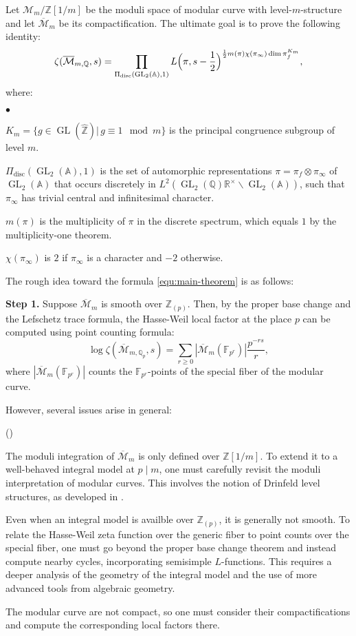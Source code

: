 \documentclass[a4paper, reqno]{amsart} %
\theoremstyle{definition}
\numberwithin{equation}{section}
\newcommand{\mbA}{\mathbb{A}}
\newcommand{\mbF}{\mathbb{F}}
\newcommand{\mbQ}{\mathbb{Q}}
\newcommand{\mbR}{\mathbb{R}}
\newcommand{\mbZ}{\mathbb{Z}}
\newcommand{\mcM}{\mathcal{M}}
\newcommand{\ov}{\overline}
\newenvironment{altenumerate}
	{\begin{list}
			{(\theenumi) }
			{\usecounter{enumi}
				\setlength{\labelwidth}{0pt}
				\setlength{\labelsep}{0pt}
				\setlength{\leftmargin}{0pt}
				\setlength{\itemsep}{\the\smallskipamount}
				\renewcommand{\theenumi}{\arabic{enumi}}
		}}
		{\end{list}}
\newenvironment{altitemize}
	{\begin{list}
			{$\bullet$}
			{\setlength{\labelwidth}{0pt}
				\setlength{\itemindent}{5pt}
				\setlength{\labelsep}{5pt}
				\setlength{\leftmargin}{0pt}
				\setlength{\itemsep}{\the\smallskipamount}
		}}
		{\end{list}}
\newcommand{\GL}{\operatorname{GL}}
\newcommand{\wh}{\widehat}
\begin{document}
Let $\mcM_m/\mbZ[1/m]$ be the moduli space of modular curve with level-$m$-structure and let $\ov{\mcM}_m$ be its compactification. The ultimate goal is to prove the following identity:
\begin{equation}\label{equ:main-theorem}
\zeta(\ov{\mcM}_{m,\mbQ},s)=\prod_{\Pi_{\mathrm{disc}}(\GL_2(\mbA),1)}L\Bigl(\pi,s-\frac{1}{2}\Bigr)^{\frac{1}{2}m(\pi)\chi(\pi_\infty)\dim \pi_f^{K_m}},
\end{equation}
where:
\begin{altitemize}
\item $K_m=\{g\in \GL(\wh{\mbZ}) | \, g\equiv 1 \mod m\}$ is the principal congruence subgroup of level $m$.
\item $\Pi_{\mathrm{disc}}(\GL_2(\mbA),1)$ is the set of automorphic representations $\pi=\pi_f\otimes\pi_\infty$ of $\GL_2(\mbA)$ that occurs discretely in $L^2(\GL_2(\mbQ)\mbR^\times\backslash \GL_2(\mbA))$, such that $\pi_\infty$ has trivial central and infinitesimal character.
\item $m(\pi)$ is the multiplicity of $\pi$ in the discrete spectrum, which equals $1$ by the multiplicity-one theorem.
\item $\chi(\pi_\infty)$ is $2$ if $\pi_\infty$ is a character and $-2$ otherwise.
\end{altitemize}

The rough idea toward the formula \eqref{equ:main-theorem} is as follows:

\noindent\textbf{Step 1.} Suppose $\ov{\mcM}_m$ is smooth over $\mbZ_{(p)}$. Then, by the proper base change and the Lefschetz trace formula, the Hasse-Weil local factor at the place $p$ can be computed using point counting formula:
\begin{equation*}
\log \zeta(\ov{\mcM}_{m,\mbQ_p},s)=\sum_{r\geq 0}|\ov{\mcM}_{m}(\mbF_{p^r})|\frac{p^{-rs}}{r},
\end{equation*}
where $|\ov{\mcM}_{m}(\mbF_{p^r})|$ counts the $\mbF_{p^r}$-points of the special fiber of the modular curve.

However, several issues arise in general:
\begin{altenumerate}
\item The moduli integration of $\ov{\mcM}_m$ is only defined over $\mbZ[1/m]$. To extend it to a well-behaved integral model at $p\mid m$, one must carefully revisit the moduli interpretation of modular curves.
This involves the notion of Drinfeld level structures, as developed in \cite{Katz-Mazur}.
\item Even when an integral model is availble over $\mbZ_{(p)}$, it is generally not smooth. To relate the Hasse-Weil zeta function over the generic fiber to point counts over the special fiber, one must go beyond the proper base change theorem and instead compute nearby cycles, incorporating semisimple $L$-functions. This requires a deeper analysis of the geometry of the integral model and the use of more advanced tools from algebraic geometry.
\item The modular curve are not compact, so one must consider their compactifications and compute the corresponding local factors there.
\end{altenumerate}
\end{document}
